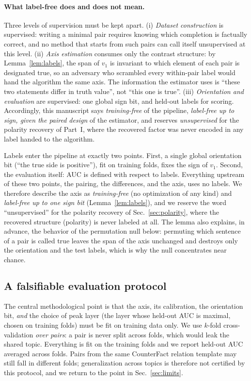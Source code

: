 \documentclass[11pt]{article}
\begin{document}
\paragraph{What label-free does and does not mean.} Three levels of
supervision must be kept apart. (i) \emph{Dataset construction} is
supervised: writing a minimal pair requires knowing which completion is
factually correct, and no method that starts from such pairs can call
itself unsupervised at this level. (ii) \emph{Axis estimation} consumes
only the contrast structure: by Lemma~\ref{lem:labels}, the span of $v_1$
is invariant to which element of each pair is designated true, so an
adversary who scrambled every within-pair label would hand the algorithm
the same axis. The information the estimator uses is ``these two
statements differ in truth value'', not ``this one is true''.
(iii) \emph{Orientation and evaluation} are supervised: one global sign
bit, and held-out labels for scoring. Accordingly, this manuscript says
\emph{training-free} of the pipeline, \emph{label-free up to sign, given
the paired design} of the estimator, and reserves \emph{unsupervised} for
the polarity recovery of Part~I, where the recovered factor was never
encoded in any label handed to the algorithm.


Labels enter the pipeline at exactly two points. First, a single global
orientation bit (``the true side is positive''), fit on training folds,
fixes the sign of $v_1$. Second, the evaluation itself: AUC is defined with
respect to labels. Everything upstream of these two points, the pairing, the
differences, and the axis, uses no labels. We therefore describe the axis as
\emph{training-free} (no optimization of any kind) and \emph{label-free up to
one sign bit} (Lemma~\ref{lem:labels}), and we reserve the word
``unsupervised'' for the polarity recovery of Sec.~\ref{sec:polarity}, where
the recovered structure (polarity) is never labeled at all. The lemma also
explains, in advance, the behavior of the permutation null below: permuting
which sentence of a pair is called true leaves the span of the axis
unchanged and destroys only the orientation and the test labels, which is why
the null concentrates near chance.

\subsection{A falsifiable evaluation protocol}
\label{sec:protocol}

The central methodological point is that the axis, its calibration, the
orientation bit, \emph{and} the choice of peak layer (the layer whose held-out AUC is maximal, chosen on training folds) must be fit on training
data only. We use $k$-fold cross-validation \emph{over pairs}: a pair is
never split across folds, which would leak the shared topic. Everything is
fit on the training folds and we report held-out AUC averaged across folds.
Pairs from the same CounterFact relation template may still fall in
different folds; generalization across topics is therefore not certified by
this protocol, and we return to the point in Sec.~\ref{sec:limits}.
\end{document}

